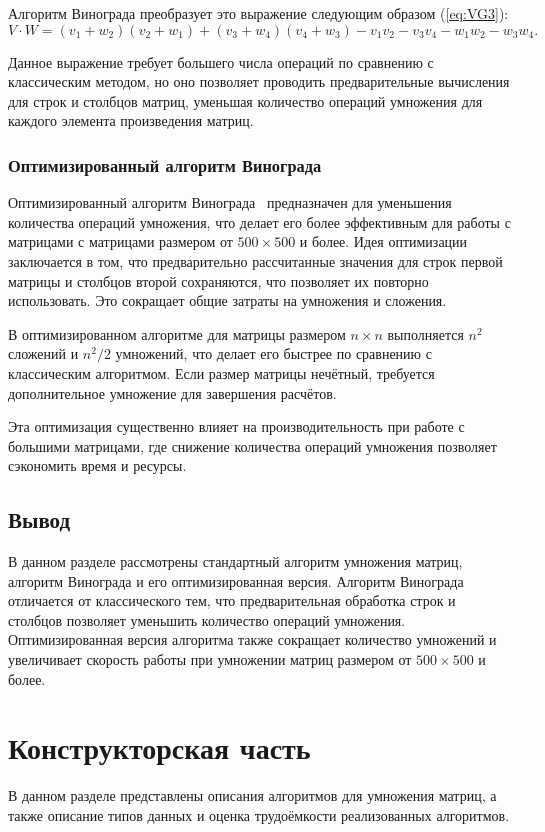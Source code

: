 \documentclass[a4paper, 12pt]{extreport}
\begin{document}
Алгоритм Винограда преобразует это выражение следующим образом (\ref{eq:VG3}):
\begin{equation}
	\label{eq:VG3}
	V \cdot W = (v_1 + w_2)(v_2 + w_1) + (v_3 + w_4)(v_4 + w_3) - v_1v_2 - v_3v_4 - w_1w_2 - w_3w_4.
\end{equation}

Данное выражение требует большего числа операций по сравнению с классическим методом, но оно позволяет проводить предварительные вычисления для строк и столбцов матриц, уменьшая количество операций умножения для каждого элемента произведения матриц.

\subsection{Оптимизированный алгоритм Винограда}
Оптимизированный алгоритм Винограда~\cite{bib2} предназначен для уменьшения количества операций умножения, что делает его более эффективным для работы с матрицами с матрицами размером от 
$500 \times 500$ и более. Идея оптимизации заключается в том, что предварительно рассчитанные значения для строк первой матрицы и столбцов второй сохраняются, что позволяет их повторно использовать. Это сокращает общие затраты на умножения и сложения.

В оптимизированном алгоритме для матрицы размером $n \times n$ выполняется $n^2$ сложений и $n^2/2$ умножений, что делает его быстрее по сравнению с классическим алгоритмом. Если размер матрицы нечётный, требуется дополнительное умножение для завершения расчётов.

Эта оптимизация существенно влияет на производительность при работе с большими матрицами, где снижение количества операций умножения позволяет сэкономить время и ресурсы.

\section*{Вывод}

В данном разделе рассмотрены стандартный алгоритм умножения матриц, алгоритм Винограда и его оптимизированная версия. Алгоритм Винограда отличается от классического тем, что предварительная обработка строк и столбцов позволяет уменьшить количество операций умножения. Оптимизированная версия алгоритма также сокращает количество умножений и увеличивает скорость работы при умножении матриц размером от $500 \times 500$ и более.


\chapter{Конструкторская часть}
В данном разделе представлены описания алгоритмов для умножения матриц, а также описание типов данных и оценка трудоёмкости реализованных алгоритмов.
\end{document}
